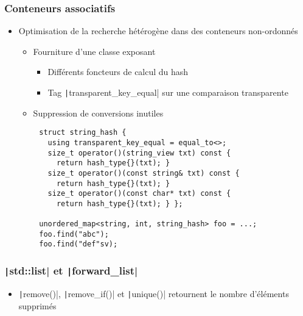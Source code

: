 \documentclass[C++.tex]{subfiles}
\begin{document}
\begin{frame}[fragile]
	\frametitle{Conteneurs associatifs}
	\begin{itemize}
		\item Optimisation de la recherche hétérogène dans des conteneurs non-ordonnés
		\begin{itemize}
			\item Fourniture d'une classe exposant
			\begin{itemize}
				\item Différents foncteurs de calcul du hash
				\item Tag \texttt|transparent_key_equal| sur une comparaison transparente


			\end{itemize}
			\item Suppression de conversions inutiles
		\end{itemize}
	\end{itemize}

	\begin{verbatim}
		struct string_hash {
		  using transparent_key_equal = equal_to<>;
		  size_t operator()(string_view txt) const { 
		    return hash_type{}(txt); }
		  size_t operator()(const string& txt) const {
		    return hash_type{}(txt); }
		  size_t operator()(const char* txt) const {
		    return hash_type{}(txt); } };

		unordered_map<string, int, string_hash> foo = ...;
		foo.find("abc");
		foo.find("def"sv);
	\end{verbatim}
\end{frame}

\begin{frame}[fragile]
	\frametitle{\texttt|std::list| et \texttt|forward_list|}
	\begin{itemize}
		\item \texttt|remove()|, \texttt|remove_if()| et \texttt|unique()| retournent le nombre d'éléments supprimés
	\end{itemize}
\end{frame}
\end{document}
